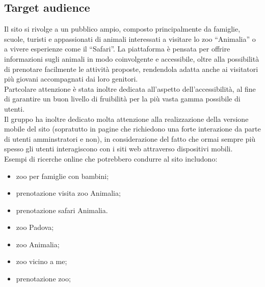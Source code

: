 \subsection{Target audience}
Il sito si rivolge a un pubblico ampio, composto principalmente da famiglie, scuole, turisti e appassionati di animali interessati a visitare lo zoo ``Animalia'' o a vivere esperienze come il ``Safari''. La piattaforma è pensata per offrire informazioni sugli animali in modo coinvolgente e accessibile, oltre alla possibilità di prenotare facilmente le attività proposte, rendendola adatta anche ai visitatori più giovani accompagnati dai loro genitori.\\
Partcolare attenzione è stata inoltre dedicata all'aspetto dell'accessibilità, al fine di garantire un buon livello di fruibilità per la più vasta gamma possibile di utenti.\\
Il gruppo ha inoltre dedicato molta attenzione alla realizzazione della versione mobile del sito (sopratutto in pagine che richiedono una forte interazione da parte di utenti amminstratori e non), in considerazione del fatto che ormai sempre più spesso gli utenti interagiscono con i siti web attraverso dispositivi mobili.\\
Esempi di ricerche online che potrebbero condurre al sito includono:
\begin{itemize}
    \item zoo per famiglie con bambini;
    \item prenotazione visita zoo Animalia;
    \item prenotazione safari Animalia.
    \item zoo Padova;
    \item zoo Animalia;
    \item zoo vicino a me;
    \item prenotazione zoo;
\end{itemize}
